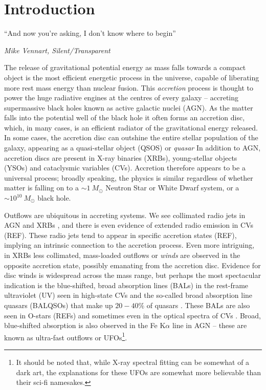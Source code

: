 \chapter{Introduction}

\epigraph{``And now you're asking, I don't know where to begin''}{{\sl Mike Vennart, Silent/Transparent}}
%

The release of gravitational potential energy as mass falls towards
a compact object is the most efficient energetic process in the universe,
capable of liberating more rest mass energy than nuclear fusion.
This {\em accretion} process is thought to power the huge radiative engines at the 
centres of every galaxy -- accreting supermassive black holes known as active galactic nuclei (AGN).
As the matter falls into the potential well of the black hole it often forms an accretion disc,
which, in many cases, is an efficient radiator of the gravitational energy released.
In some cases, the accretion disc can outshine the entire stellar population of the galaxy,
appearing as a quasi-stellar object (QSOS) or {\em quasar} 
In addition to AGN, accretion discs are present in X-ray binaries (XRBs), young-stellar objects (YSOs) and
cataclysmic variables (CVs). Accretion therefore appears to be a universal process; 
broadly speaking, the physics is similar regardless of 
whether matter is falling on to a $\sim1~M_\odot$ Neutron Star or White Dwarf 
system, or a $\sim10^{10}~M_\odot$ black hole. 

Outflows are ubiquitous in accreting systems. We see collimated radio jets in AGN 
\citep{hazard1963,potash1980,perley1984,marscher2006} and XRBs \citep{bellonijet2010}, 
and there is even evidence of extended radio emission in CVs (REF). These radio jets
tend to appear in specific accretion states (REF), implying an intrinsic connection to the 
accretion process. Even more intriguing, in XRBs less collimated, mass-loaded outflows
or {\em winds} are observed in the opposite accretion state, possibly emanating from the accretion disc.
Evidence for disc winds is widespread across the mass range, but perhaps the most spectacular indication
is the blue-shifted, broad absorption lines (BALs) in the rest-frame ultraviolet (UV)
seen in high-state CVs \citep{heap1978,greensteinoke1982,cordova1982}
and the so-called broad absorption line quasars (BALQSOs) that make up $20-40\%$
of quasars \citep{weymann1991,knigge2008,allen2011}. 
These BALs are also seen in O-stars (REFs) and sometimes even
in the optical spectra of CVs \citep{patterson1996, RN98, kafka2004}. 
Broad, blue-shifted absorption is also observed in the Fe K$\alpha$ line in 
AGN \citep{reeves2003,poundsreeves2009,tombesi2010a} -- these are known
as ultra-fast outflows or UFOs\footnote{It should be noted that, while X-ray spectral
fitting can be somewhat of a dark art, the explanations for these
UFOs are somewhat more believable than their sci-fi namesakes.}.

